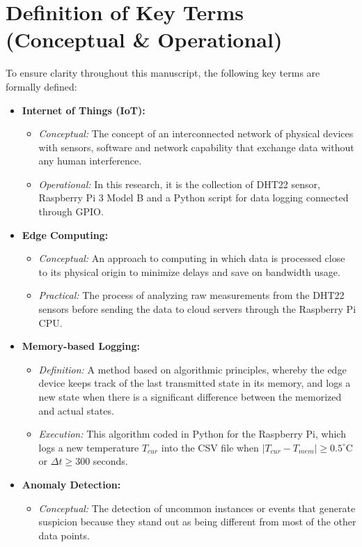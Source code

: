 \section{Definition of Key Terms (Conceptual \& Operational)}
To ensure clarity throughout this manuscript, the following key terms are formally defined:
\begin{itemize}
\item \textbf{Internet of Things (IoT):}
\begin{itemize}
    \item \textit{Conceptual:} The concept of an interconnected network of physical devices with sensors, software and network capability that exchange data without any human interference.
    \item \textit{Operational:} In this research, it is the collection of DHT22 sensor, Raspberry Pi 3 Model B and a Python script for data logging connected through GPIO.
    \end{itemize}
   \item \textbf{Edge Computing:}
    \begin{itemize}
        \item \textit{Conceptual:} An approach to computing in which data is processed close to its physical origin to minimize delays and save on bandwidth usage.
        \item \textit{Practical:} The process of analyzing raw measurements from the DHT22 sensors before sending the data to cloud servers through the Raspberry Pi CPU.
    \end{itemize}
   \item \textbf{Memory-based Logging:}
    \begin{itemize}
        \item \textit{Definition:} A method based on algorithmic principles, whereby the edge device keeps track of the last transmitted state in its memory, and logs a new state when there is a significant difference between the memorized and actual states.
        \item \textit{Execution:} This algorithm coded in Python for the Raspberry Pi, which logs a new temperature $T_{cur}$ into the CSV file when $|T_{cur} - T_{mem}| \geq 0.5^\circ$C or $\Delta t \geq 300$ seconds.
    \end{itemize}
    \item \textbf{Anomaly Detection:}
    \begin{itemize}
    \item \textit{Conceptual:} The detection of uncommon instances or events that generate suspicion because they stand out as being different from most of the other data points.

\end{itemize}
\end{itemize}
